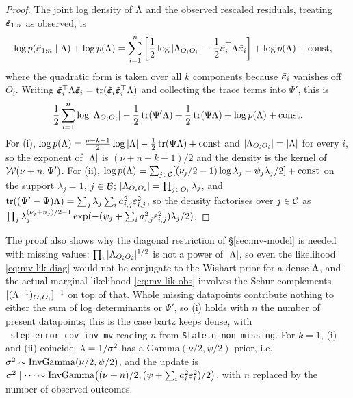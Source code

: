 \begin{proof}
	The joint log density of $\Lambda$ and the observed rescaled residuals,
	treating $\tilde{\bm{\varepsilon}}_{1:n}$ as observed, is
	\begin{align}
		\log p(\tilde{\bm{\varepsilon}}_{1:n} \mid \Lambda) + \log p(\Lambda)
		 & = \sum_{i=1}^n \left[
		\frac{1}{2}\log\left|\Lambda_{O_iO_i}\right|
		- \frac{1}{2}\tilde{\bm{\varepsilon}}_i^\top \Lambda \tilde{\bm{\varepsilon}}_i
		\right] + \log p(\Lambda) + \text{const},
	\end{align}
	where the quadratic form is taken over all $k$ components because
	$\tilde{\bm{\varepsilon}}_i$ vanishes off $O_i$. Writing
	$\tilde{\bm{\varepsilon}}_i^\top \Lambda \tilde{\bm{\varepsilon}}_i =
		\operatorname{tr}(\tilde{\bm{\varepsilon}}_i\tilde{\bm{\varepsilon}}_i^\top \Lambda)$ and collecting
	the trace terms into $\Psi'$, this is
	\begin{equation}
		\frac{1}{2}\sum_{i=1}^n \log\left|\Lambda_{O_iO_i}\right|
		- \frac{1}{2}\operatorname{tr}(\Psi' \Lambda) + \frac{1}{2}\operatorname{tr}(\Psi \Lambda)
		+ \log p(\Lambda) + \text{const}.
	\end{equation}
	For (i), $\log p(\Lambda) = \frac{\nu - k - 1}{2}\log|\Lambda| -
		\frac{1}{2}\operatorname{tr}(\Psi \Lambda) + \text{const}$ and
	$|\Lambda_{O_iO_i}| = |\Lambda|$ for every $i$, so the exponent of
	$|\Lambda|$ is $(\nu + n - k - 1)/2$ and the density is the kernel of
	$\mathcal{W}(\nu + n, \Psi')$.
	For (ii), $\log p(\Lambda) = \sum_{j \in \mathcal{C}} [(\nu_j/2 - 1)\log\lambda_j
			- \psi_j\lambda_j/2] + \text{const}$ on the support
	$\lambda_j = 1$, $j \in \mathcal{B}$;
	$|\Lambda_{O_iO_i}| = \prod_{j \in O_i}\lambda_j$, and
	$\operatorname{tr}((\Psi' - \Psi)\Lambda) = \sum_j \lambda_j \sum_i a_{i,j}^2
		\varepsilon_{i,j}^2$, so the density factorises over $j \in \mathcal{C}$ as
	$\prod_j \lambda_j^{(\nu_j + n_j)/2 - 1}
		\exp(-(\psi_j + \sum_i a_{i,j}^2\varepsilon_{i,j}^2)\lambda_j/2)$.
\end{proof}

The proof also shows why the diagonal restriction of \S\ref{sec:mv-model}
is needed with missing values: $\prod_i |\Lambda_{O_iO_i}|^{1/2}$ is not a
power of $|\Lambda|$, so even the likelihood \eqref{eq:mv-lik-diag} would not
be conjugate to the Wishart prior for a dense $\Lambda$, and the actual
marginal likelihood \eqref{eq:mv-lik-obs} involves the Schur complements
$[(\Lambda^{-1})_{O_iO_i}]^{-1}$ on top of that. Whole missing datapoints
contribute nothing to either the sum of log determinants or $\Psi'$, so (i)
holds with $n$ the number of present datapoints; this is the case bartz
keeps dense, with \texttt{\_step\_error\_cov\_inv\_mv} reading $n$ from
\texttt{State.n\_non\_missing}.
For $k = 1$, (i) and (ii)
coincide: $\lambda = 1/\sigma^{2}$ has a $\mathrm{Gamma}(\nu/2, \psi/2)$ prior,
i.e.\ $\sigma^{2} \sim \mathrm{InvGamma}(\nu/2, \psi/2)$, and the update is
$\sigma^{2} \mid \cdots \sim \mathrm{InvGamma}\bigl((\nu + n)/2, (\psi + \sum_i a_i^2
	\varepsilon_i^2)/2\bigr)$, with $n$ replaced by the number of observed
outcomes.

